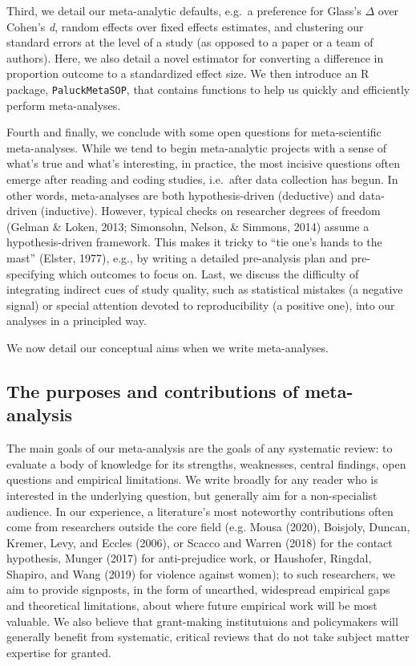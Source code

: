 \documentclass[
  man]{apa6}
\begin{document}
Third, we detail our meta-analytic defaults, e.g.~a preference for Glass's \(\Delta\) over Cohen's \emph{d}, random effects over fixed effects estimates, and clustering our standard errors at the level of a study (as opposed to a paper or a team of authors). Here, we also detail a novel estimator for converting a difference in proportion outcome to a standardized effect size. We then introduce an R package, \texttt{PaluckMetaSOP}, that contains functions to help us quickly and efficiently perform meta-analyses.

Fourth and finally, we conclude with some open questions for meta-scientific meta-analyses. While we tend to begin meta-analytic projects with a sense of what's true and what's interesting, in practice, the most incisive questions often emerge after reading and coding studies, i.e.~after data collection has begun. In other words, meta-analyses are both hypothesis-driven (deductive) and data-driven (inductive). However, typical checks on researcher degrees of freedom (Gelman \& Loken, 2013; Simonsohn, Nelson, \& Simmons, 2014) assume a hypothesis-driven framework. This makes it tricky to ``tie one's hands to the mast'' (Elster, 1977), e.g., by writing a detailed pre-analysis plan and pre-specifying which outcomes to focus on. Last, we discuss the difficulty of integrating indirect cues of study quality, such as statistical mistakes (a negative signal) or special attention devoted to reproducibility (a positive one), into our analyses in a principled way.

We now detail our conceptual aims when we write meta-analyses.

\subsection{The purposes and contributions of meta-analysis}\label{the-purposes-and-contributions-of-meta-analysis}

The main goals of our meta-analysis are the goals of any systematic review: to evaluate a body of knowledge for its strengths, weaknesses, central findings, open questions and empirical limitations. We write broadly for any reader who is interested in the underlying question, but generally aim for a non-specialist audience. In our experience, a literature's most noteworthy contributions often come from researchers outside the core field (e.g. Mousa (2020), Boisjoly, Duncan, Kremer, Levy, and Eccles (2006), or Scacco and Warren (2018) for the contact hypothesis, Munger (2017) for anti-prejudice work, or Haushofer, Ringdal, Shapiro, and Wang (2019) for violence against women); to such researchers, we aim to provide signposts, in the form of unearthed, widespread empirical gaps and theoretical limitations, about where future empirical work will be most valuable. We also believe that grant-making institutuions and policymakers will generally benefit from systematic, critical reviews that do not take subject matter expertise for granted.
\end{document}
